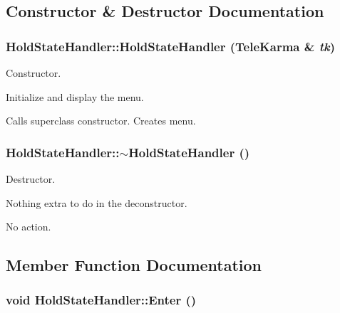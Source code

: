 \subsection{Constructor \& Destructor Documentation}
\hypertarget{classHoldStateHandler_66a0d60b47d1877c942f1d73cdd51142}{
\subsubsection[{HoldStateHandler}]{\setlength{\rightskip}{0pt plus 5cm}HoldStateHandler::HoldStateHandler ({\bf TeleKarma} \& {\em tk})}}
\label{classHoldStateHandler_66a0d60b47d1877c942f1d73cdd51142}


Constructor. 

Initialize and display the menu.

Calls superclass constructor. Creates menu.\hypertarget{classHoldStateHandler_f4ae8935de47b0016f9f002dc7737627}{
\subsubsection[{$\sim$HoldStateHandler}]{\setlength{\rightskip}{0pt plus 5cm}HoldStateHandler::$\sim$HoldStateHandler ()}}
\label{classHoldStateHandler_f4ae8935de47b0016f9f002dc7737627}


Destructor. 

Nothing extra to do in the deconstructor.

No action. 

\subsection{Member Function Documentation}
\hypertarget{classHoldStateHandler_29f89f435a48b793e153ede7c5d94397}{
\subsubsection[{Enter}]{\setlength{\rightskip}{0pt plus 5cm}void HoldStateHandler::Enter ()}}
\label{classHoldStateHandler_29f89f435a48b793e153ede7c5d94397}


